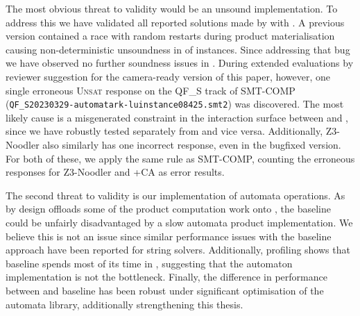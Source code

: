 The most obvious threat to validity would be an unsound implementation. To
address this we have validated all reported solutions made by \Calculus{} with
\Nuxmv{}. A previous version contained a race with random restarts during
product materialisation causing non-deterministic unsoundness in 
of instances. Since addressing that bug we have observed no further soundness
issues in \Catra{}. During extended evaluations by reviewer suggestion for the 
camera-ready version of this paper, however, one single erroneous \textsc{Unsat} 
response on the QF\_S track of 
SMT-COMP (\texttt{QF\_S\/20230329-automatark-lu\/instance08425.smt2}) was discovered.
The most likely cause is a misgenerated constraint in the interaction surface between \Ostrich{}
and \Catra{}, since we have robustly tested 
\Catra{} separately from \Ostrich{} and vice versa. Additionally, Z3-Noodler
also similarly has one incorrect response, even in the bugfixed version. For both of
these, we apply the same rule as SMT-COMP, counting the erroneous responses for Z3-Noodler
and \Ostrich{}+CA as error results.

The second threat to validity is our implementation of automata operations. As
\Calculus{} by design offloads some of the product computation work onto
\Princess{}, the baseline could be unfairly disadvantaged by a slow automata
product implementation. We believe this is not an issue since similar
performance issues with the baseline approach have been reported for string
solvers. Additionally, profiling shows that baseline spends most of its time in
\Princess{}, suggesting that the automaton implementation is not the bottleneck.
Finally, the difference in performance between \Calculus{} and baseline has been
robust under significant optimisation of the automata library, additionally
strengthening this thesis.

